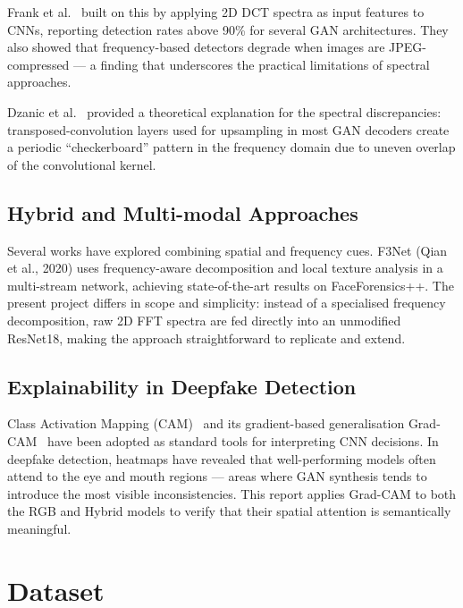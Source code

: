 \documentclass[12pt, a4paper]{article}
\begin{document}
Frank et al.~\cite{frank2020frequency} built on this by applying 2D DCT
spectra as input features to CNNs, reporting detection rates above 90\% for
several GAN architectures.  They also showed that frequency-based detectors
degrade when images are JPEG-compressed — a finding that underscores the
practical limitations of spectral approaches.

Dzanic et al.~\cite{dzanic2020fourier} provided a theoretical explanation
for the spectral discrepancies: transposed-convolution layers used for
upsampling in most GAN decoders create a periodic ``checkerboard'' pattern in
the frequency domain due to uneven overlap of the convolutional kernel.

\subsection{Hybrid and Multi-modal Approaches}

Several works have explored combining spatial and frequency cues.  F3Net
(Qian et al., 2020) uses frequency-aware decomposition and local texture
analysis in a multi-stream network, achieving state-of-the-art results on
FaceForensics++.  The present project differs in scope and simplicity:
instead of a specialised frequency decomposition, raw 2D FFT spectra are fed
directly into an unmodified ResNet18, making the approach straightforward to
replicate and extend.

\subsection{Explainability in Deepfake Detection}

Class Activation Mapping (CAM)~\cite{zhou2016cam} and its gradient-based
generalisation Grad-CAM~\cite{selvaraju2017gradcam} have been adopted as
standard tools for interpreting CNN decisions.  In deepfake detection,
heatmaps have revealed that well-performing models often attend to the eye
and mouth regions — areas where GAN synthesis tends to introduce the most
visible inconsistencies.  This report applies Grad-CAM to both the RGB and
Hybrid models to verify that their spatial attention is semantically
meaningful.

\section{Dataset}
\label{sec:dataset}
\end{document}
